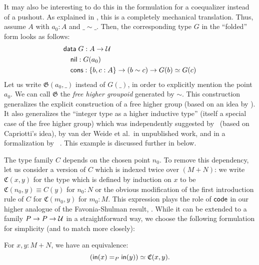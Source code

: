 It may also be interesting to do this in the formulation for a coequalizer
instead of a pushout.
As explained in , this is a completely mechanical translation.
Thus, assume $A$ with $a_0 : A$ and $\_\sim\_$.
Then, the corresponding type $G$ in the ``folded'' form looks as follows:
\begin{equation} \label{eq:free-higher-groupoid-nice}
 \begin{alignedat}{1}
  & \mathsf{data} \; G : A \to \mathcal{U} \\
   & \quad \mathsf{nil} : G(a_0) \\
   & \quad \mathsf{cons} : \{b,c:A\} \to (b \sim c) \to G(b) \simeq G(c)
 \end{alignedat}
\end{equation}
Let us write $\mathfrak G(a_0, \_)$ instead of $G(\_)$, in order to explicitly
mention the point $a_0$.
We can call $\mathfrak G$ the \emph{free higher groupoid} generated by $\sim$.
This construction generalizes the explicit construction of a free higher group
(based on an idea by \citet{kraus_FHG}).
It also generalizes the ``integer type as a higher inductive type''
(itself a special case of the free higher group) which was independently suggested
by~\citet{gun:squid} (based on Capriotti's idea),
by van der Weide et al.\ in unpublished work, and in a formalization by
~\citet{Evan:Squid}.
This example is discussed further in  below.

The type family $C$ depends on the chosen point $n_0$.
To remove this dependency, let us consider a version of $C$ which is indexed
twice over $(M+N)$:
we write $\mathfrak C(x, y)$ for the type which is defined by induction on $x$ to
be $\mathfrak C(n_0, y) \equiv C(y)$ for $n_0 : N$ or the obvious modification of
the first introduction rule of $C$ for
$\mathfrak C(m_0, y)$ for $m_0 : M$.
This expression plays the role of $\mathsf{code}$ in our higher analogue of
the Favonia-Shulman result, .
While it can be extended to a family $P \to P \to \mathcal{U}$ in a straightforward way,
we choose the following formulation for simplicity
(and to match  more closely):

\begin{thm}\label{thm:paths-higher-SvK}
 For $x,y : M+N$, we have an equivalence:
 \begin{equation} \label{eq:thm-higher-svk}
  \left(\mathsf{in}(x) =_P \mathsf{in}(y)\right) \simeq \mathfrak C (x,y).
 \end{equation}
\end{thm}

